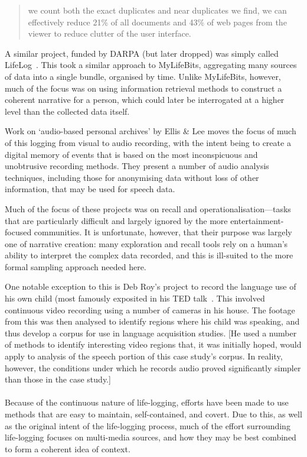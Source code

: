 \begin{quote}
we count both the exact duplicates and near duplicates we find, we can effectively reduce 21\% of all documents and 43\% of web pages from the viewer to reduce clutter of the user interface.
\end{quote}

A similar project, funded by DARPA (but later dropped) was simply called LifeLog~\cite{allen2008dredging}.  This took a similar approach to MyLifeBits, aggregating many sources of data into a single bundle, organised by time.  Unlike MyLifeBits, however, much of the focus was on using information retrieval methods to construct a coherent narrative for a person, which could later be interrogated at a higher level than the collected data itself.

Work on `audio-based personal archives' by Ellis \& Lee\cite{ellis2004audiolog} moves the focus of much of this logging from visual to audio recording, with the intent being to create a digital memory of events that is based on the most inconspicuous and unobtrusive recording methods.  They present a number of audio analysis techniques, including those for anonymising data without loss of other information, that may be used for speech data.

Much of the focus of these projects was on recall and operationalisation---tasks that are particularly difficult and largely ignored by the more entertainment-focused communities.  It is unfortunate, however, that their purpose was largely one of narrative creation: many exploration and recall tools rely on a human's ability to interpret the complex data recorded, and this is ill-suited to the more formal sampling approach needed here.

One notable exception to this is Deb Roy's project to record the language use of his own child (most famously exposited in his TED talk~\cite{roy2011ted}.  This involved continuous video recording using a number of cameras in his house.  The footage from this was then analysed to identify regions where his child was speaking, and thus develop a corpus for use in language acquisition studies.  [He used a number of methods to identify interesting video regions that, it was initially hoped, would apply to analysis of the speech portion of this case study's corpus.  In reality, however, the conditions under which he records audio proved significantly simpler than those in the case study.]



\paragraph{}
Because of the continuous nature of life-logging, efforts have been made to use methods that are easy to maintain, self-contained, and covert.  Due to this, as well as the original intent of the life-logging process, much of the effort surrounding life-logging focuses on multi-media sources, and how they may be best combined to form a coherent idea of context.  


